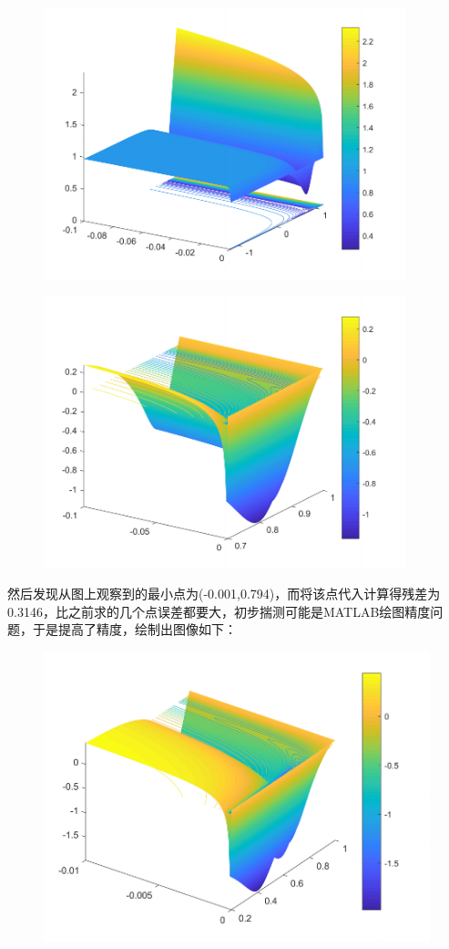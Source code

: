 \begin{figure}[H]
\centering
\includegraphics[width=10.5cm]{fig/6_7.pdf}
\end{figure}

\begin{figure}[H]
\centering
\includegraphics[width=10.5cm]{fig/6_2.pdf}
\end{figure}

然后发现从图上观察到的最小点为(-0.001,0.794)，而将该点代入计算得残差为0.3146，比之前求的几个点误差都要大，初步揣测可能是MATLAB绘图精度问题，于是提高了精度，绘制出图像如下：

\begin{figure}[H]
\centering
\includegraphics[width=12cm]{fig/6_8.pdf}
\end{figure}

